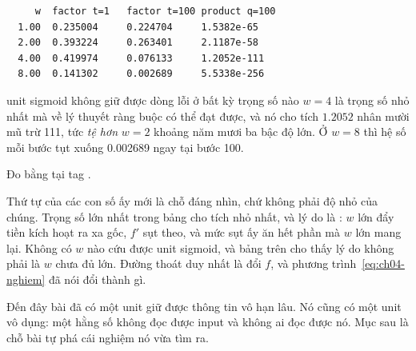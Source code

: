 \begin{verbatim}
     w  factor t=1   factor t=100 product q=100
  1.00  0.235004     0.224704     1.5382e-65
  2.00  0.393224     0.263401     2.1187e-58
  4.00  0.419974     0.076133     1.2052e-111
  8.00  0.141302     0.002689     5.5338e-256
\end{verbatim}

\begin{measured}{unit sigmoid không giữ được dòng lỗi ở bất kỳ trọng số nào}
\(w = 4\) là trọng số nhỏ nhất mà về lý thuyết ràng buộc có thể đạt được, và nó
cho tích \(1.2052\) nhân mười mũ trừ 111, tức \emph{tệ hơn} \(w = 2\) khoảng
năm mươi ba bậc độ lớn. Ở \(w = 8\) thì hệ số mỗi bước tụt xuống 0.002689 ngay
tại bước 100.

Đo bằng  tại tag .
\end{measured}

Thứ tự của các con số ấy mới là chỗ đáng nhìn, chứ không phải độ nhỏ của chúng.
Trọng số lớn nhất trong bảng cho tích nhỏ nhất, và lý do là
: \(w\) lớn đẩy tiền kích hoạt ra xa gốc, \(f'\) sụt
theo, và mức sụt ấy ăn hết phần mà \(w\) lớn mang lại. Không có \(w\) nào cứu
được unit sigmoid, và bảng trên cho thấy lý do không phải là \(w\) chưa đủ lớn.
Đường thoát duy nhất là đổi \(f\), và
phương trình~\eqref{eq:ch04-nghiem} đã nói đổi thành gì.

Đến đây bài đã có một unit giữ được thông tin vô hạn lâu. Nó cũng có một unit
vô dụng: một hằng số không đọc được input và không ai đọc được nó. Mục sau là
chỗ bài tự phá cái nghiệm nó vừa tìm ra.
